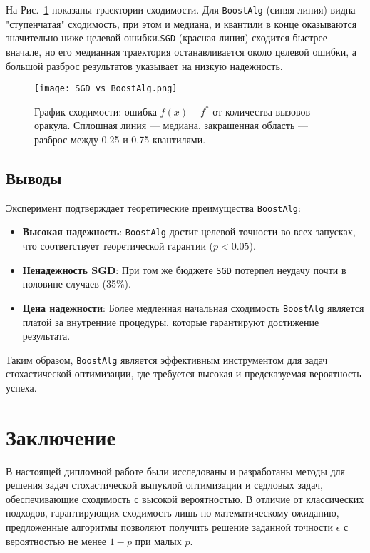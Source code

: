 На Рис.~\ref{fig:convergence} показаны траектории сходимости. Для \texttt{BoostAlg} (синяя линия) видна "ступенчатая" сходимость, при этом и медиана, и квантили в конце оказываются значительно ниже целевой ошибки.\texttt{SGD} (красная линия) сходится быстрее вначале, но его медианная траектория останавливается около целевой ошибки, а большой разброс результатов указывает на низкую надежность.

\begin{figure}[h!]
\centering
\texttt{[image: SGD\_vs\_BoostAlg.png]}
\caption{График сходимости: ошибка $f(x) - f^*$ от количества вызовов оракула. Сплошная линия — медиана, закрашенная область — разброс между 0.25 и 0.75 квантилями.}
\label{fig:convergence}
\end{figure}

\subsection{Выводы}

Эксперимент подтверждает теоретические преимущества \texttt{BoostAlg}:
\begin{itemize}
    \item \textbf{Высокая надежность}: \texttt{BoostAlg} достиг целевой точности во всех запусках, что соответствует теоретической гарантии ($p < 0.05$).
    \item \textbf{Ненадежность SGD}: При том же бюджете \texttt{SGD} потерпел неудачу почти в половине случаев (35\%).
    \item \textbf{Цена надежности}: Более медленная начальная сходимость \texttt{BoostAlg} является платой за внутренние процедуры, которые гарантируют достижение результата.
\end{itemize}
Таким образом, \texttt{BoostAlg} является эффективным инструментом для задач стохастической оптимизации, где требуется высокая и предсказуемая вероятность успеха.

\section{Заключение}

В настоящей дипломной работе были исследованы и разработаны методы для решения задач стохастической выпуклой оптимизации и седловых задач, обеспечивающие сходимость с высокой вероятностью. В отличие от классических подходов, гарантирующих сходимость лишь по математическому ожиданию, предложенные алгоритмы позволяют получить решение заданной точности $\epsilon$ с вероятностью не менее $1-p$ при малых $p$.

